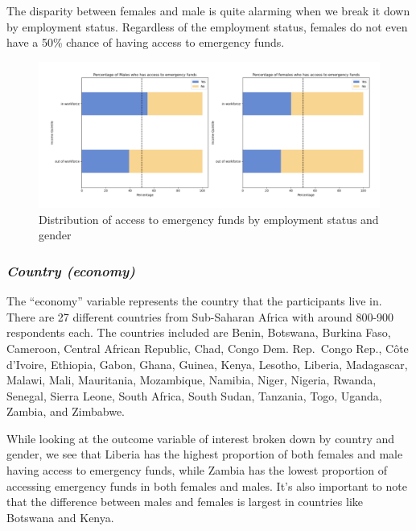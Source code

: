 \documentclass[12pt]{article}
\begin{document}
The disparity between females and male is quite alarming when we break
it down by employment status. Regardless of the employment status,
females do not even have a 50\% chance of having access to emergency
funds.

\begin{figure}

{\centering \includegraphics[width=1\linewidth]{graphs/employ_graph9} 

}

\caption{Distribution of access to emergency funds by employment status and gender}\label{fig:unnamed-chunk-12}
\end{figure}

\hypertarget{country-economy}{%
\subsubsection{\texorpdfstring{\emph{Country
(economy)}}{Country (economy)}}\label{country-economy}}

The ``economy'' variable represents the country that the participants
live in. There are 27 different countries from Sub-Saharan Africa with
around 800-900 respondents each. The countries included are Benin,
Botswana, Burkina Faso, Cameroon, Central African Republic, Chad, Congo
Dem. Rep.~Congo Rep., Côte d'Ivoire, Ethiopia, Gabon, Ghana, Guinea,
Kenya, Lesotho, Liberia, Madagascar, Malawi, Mali, Mauritania,
Mozambique, Namibia, Niger, Nigeria, Rwanda, Senegal, Sierra Leone,
South Africa, South Sudan, Tanzania, Togo, Uganda, Zambia, and Zimbabwe.

While looking at the outcome variable of interest broken down by country
and gender, we see that Liberia has the highest proportion of both
females and male having access to emergency funds, while Zambia has the
lowest proportion of accessing emergency funds in both females and
males. It's also important to note that the difference between males and
females is largest in countries like Botswana and Kenya.
\end{document}
